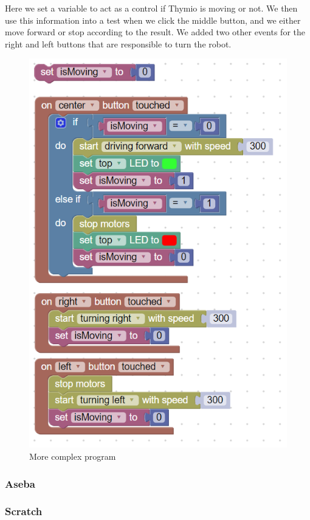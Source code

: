 \documentclass{scrartcl}
\begin{document}
Here we set a variable to act as a control if Thymio is moving or not. We then use this information into a test when we click the middle button, and we either move forward or stop according to the result. 
We added two other events for the right and left buttons that are responsible to turn the robot.
\begin{figure}[h!]
  \centering
  \includegraphics[scale=0.5]{./Blockly/advanced_program}
  \caption{More complex program}
  \label{fig:thymio_blockly_advanced_program}
\end{figure}
\subsubsection{Aseba}
\subsubsection{Scratch}
\end{document}
